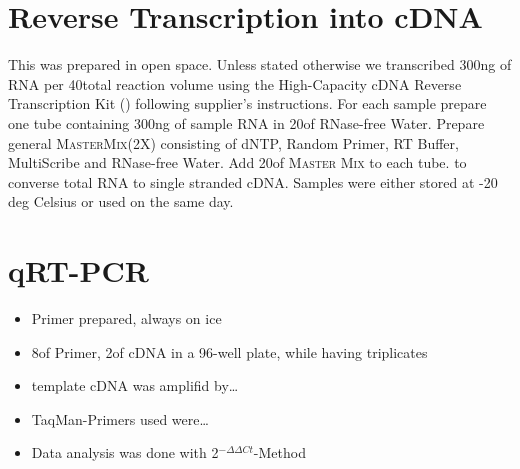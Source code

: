 \section{Reverse Transcription into cDNA}
This was prepared in open space. Unless stated otherwise we transcribed 300ng of RNA per 40\mul total reaction volume using the High-Capacity cDNA Reverse Transcription Kit () following supplier's instructions. For each sample prepare one tube containing 300ng of sample RNA in 20\mul of RNase-free Water. Prepare general \textsc{MasterMix}(2X) consisting of dNTP, Random Primer, RT Buffer, MultiScribe and RNase-free Water. Add 20\mul of \textsc{Master Mix} to each tube.  to converse total RNA to single stranded cDNA. Samples were either stored at -20 deg Celsius or used on the same day. 

\section{qRT-PCR}
\begin{itemize}
    \item Primer prepared, always on ice
    \item 8\mul of Primer, 2\mul of cDNA in a 96-well plate, while having triplicates 
    \item template cDNA was amplifid by\ldots
    \item TaqMan-Primers used were\ldots
    \item Data analysis was done with 2$^{-\Delta\Delta Ct}$-Method
\end{itemize}



